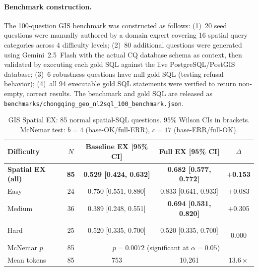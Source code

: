 \documentclass[11pt]{article}
\begin{document}
\paragraph{Benchmark construction.}
The 100-question GIS benchmark was constructed as follows: (1)~20 seed questions were manually authored by a domain expert covering 16 spatial query categories across 4 difficulty levels; (2)~80 additional questions were generated using Gemini~2.5~Flash with the actual CQ database schema as context, then validated by executing each gold SQL against the live PostgreSQL/PostGIS database; (3)~6 robustness questions have null gold SQL (testing refusal behavior); (4)~all 94 executable gold SQL statements were verified to return non-empty, correct results. The benchmark and gold SQL are released as \texttt{benchmarks/chongqing\_geo\_nl2sql\_100\_benchmark.json}.

\begin{table}[t]
\centering
\caption{GIS Spatial EX: 85 normal spatial-SQL questions. 95\% Wilson CIs in brackets. McNemar test: $b=4$ (base-OK/full-ERR), $c=17$ (base-ERR/full-OK).}
\label{tab:gis-spatial}
\begin{tabular}{lcccc}
\toprule
Difficulty & $N$ & Baseline EX [95\% CI] & Full EX [95\% CI] & $\Delta$ \\
\midrule
\textbf{Spatial EX (all)} & \textbf{85} & \textbf{0.529 [0.424, 0.632]} & \textbf{0.682 [0.577, 0.772]} & $+$\textbf{0.153} \\
Easy         & 24  & 0.750 [0.551, 0.880] & 0.833 [0.641, 0.933]          & $+$0.083 \\
Medium       & 36  & 0.389 [0.248, 0.551] & \textbf{0.694 [0.531, 0.820]} & $+$0.305 \\
Hard         & 25  & 0.520 [0.335, 0.700] & 0.520 [0.335, 0.700]          & $\phantom{+}$0.000 \\
\midrule
McNemar $p$  & 85  & \multicolumn{3}{c}{$p=0.0072$ (significant at $\alpha=0.05$)} \\
Mean tokens  & 85  & 753 & 10{,}261 & $13.6\times$ \\
\bottomrule
\end{tabular}
\end{table}
\end{document}
